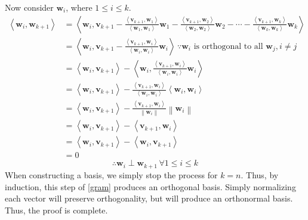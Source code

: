 \begin{longproof}
\[    \]
    Now consider \(\mathbf{w}_i\), where \(1\leq i\leq k\).
    \begin{align*}
        \left\langle \mathbf{w}_i,\mathbf{w}_{k+1}  \right\rangle &=\left\langle \mathbf{w}_i,\mathbf{v}_{k+1} - \frac{\left\langle \mathbf{v}_{k+1},\mathbf{w}_1 \right\rangle }{\left\langle \mathbf{w}_1,\mathbf{w}_1 \right\rangle }\mathbf{w}_1 - \frac{\left\langle \mathbf{v}_{k+1},\mathbf{w}_2 \right\rangle }{\left\langle \mathbf{w}_2,\mathbf{w}_2 \right\rangle }\mathbf{w}_2 -\cdots- \frac{\left\langle \mathbf{v}_{k+1},\mathbf{w}_{k}  \right\rangle }{\left\langle \mathbf{w}_{k},\mathbf{w}_{k}   \right\rangle }\mathbf{w}_{k} \right\rangle \\
        &=\left\langle \mathbf{w}_i, \mathbf{v}_{k+1}-\frac{\left\langle\mathbf{v}_{k+1},\mathbf{w}_i\right\rangle }{\left\langle\mathbf{w}_i,\mathbf{w}_i\right\rangle}\mathbf{w}_i \right\rangle \,\because \mathbf{w}_i \text{ is orthogonal to all }\mathbf{w}_j,i\neq j\\
        &=\left\langle \mathbf{w}_i,\mathbf{v}_{k+1}  \right\rangle - \left\langle \mathbf{w}_i,\frac{\left\langle\mathbf{v}_{k+1},\mathbf{w}_i\right\rangle }{\left\langle\mathbf{w}_i,\mathbf{w}_i\right\rangle}\mathbf{w}_i \right\rangle \\
        &=\left\langle \mathbf{w}_i,\mathbf{v}_{k+1}  \right\rangle - \frac{\left\langle\mathbf{v}_{k+1},\mathbf{w}_i\right\rangle }{\left\langle\mathbf{w}_i,\mathbf{w}_i\right\rangle} \left\langle \mathbf{w}_i,\mathbf{w}_i \right\rangle \\
        &=\left\langle \mathbf{w}_i,\mathbf{v}_{k+1}  \right\rangle - \frac{\left\langle\mathbf{v}_{k+1},\mathbf{w}_i\right\rangle }{\left\lVert \mathbf{w}_i \right\rVert }\left\lVert \mathbf{w}_i \right\rVert \\
        &=\left\langle \mathbf{w}_i,\mathbf{v}_{k+1}  \right\rangle - \left\langle \mathbf{v}_{k+1},\mathbf{w}_i  \right\rangle \\
        &=\left\langle \mathbf{w}_i,\mathbf{v}_{k+1}  \right\rangle - \left\langle \mathbf{w}_i,\mathbf{v}_{k+1}  \right\rangle\\
        &=0
    \end{align*}
    \[
        \therefore \mathbf{w}_i \perp \mathbf{w}_{k+1}\,\forall 1\leq i\leq k 
    \]
    When constructing a basis, we simply stop the process for \(k=n\). Thus, by induction, this step of \ref{gram} produces an orthogonal basis. Simply normalizing each vector will preserve orthogonality, but will produce an orthonormal basis. Thus, the proof is complete.
\end{longproof}
